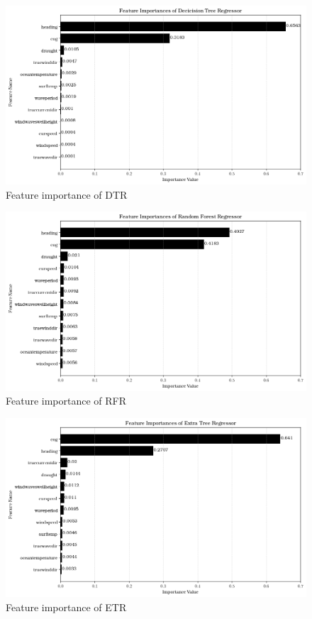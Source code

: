 \begin{figure}[h]
    \centering
        \includegraphics[width=.85\textwidth]{02_figures/dtr_ftr_importance.png}
        \caption{Feature importance of DTR}
        \label{fig:ftr_impo_dtr}
\end{figure}

\begin{figure}[h]
    \centering
        \includegraphics[width=.85\textwidth]{02_figures/rfr_ftr_importance.png}
        \caption{Feature importance of RFR}
        \label{fig:ftr_impo_rfr}
\end{figure}

\begin{figure}[h]
    \centering
        \includegraphics[width=.85\textwidth]{02_figures/etr_ftr_importance.png}
        \caption{Feature importance of ETR}
        \label{fig:ftr_impo_etr}
\end{figure}

